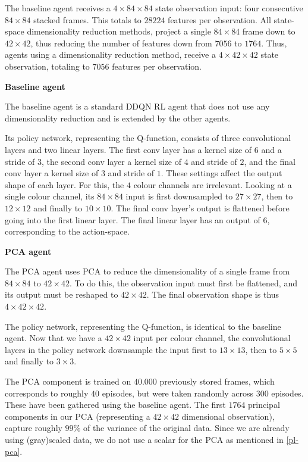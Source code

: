 The baseline agent receives a $4 \times 84 \times 84$ state observation input: four consecutive $84 \times 84$ stacked frames. This totals to $28224$ features per observation. All state-space dimensionality reduction methods, project a single $84 \times 84$ frame down to $42 \times 42$, thus reducing the number of features down from $7056$ to $1764$. Thus, agents using a dimensionality reduction method, receive a $4 \times 42 \times 42$ state observation, totaling to $7056$ features per observation. \par

\noindent \textbf{Baseline agent}\par
\noindent The baseline agent is a standard DDQN RL agent that does not use any dimensionality reduction and is extended by the other agents.

Its policy network, representing the Q-function, consists of three convolutional layers and two linear layers. The first conv layer has a kernel size of $6$ and a stride of $3$, the second conv layer a kernel size of $4$ and stride of $2$, and the final conv layer a kernel size of $3$ and stride of $1$. These settings affect the output shape of each layer. For this, the $4$ colour channels are irrelevant. Looking at a single colour channel, its $84 \times 84$ input is first downsampled to $27 \times 27$, then to $12 \times 12$ and finally to $10 \times 10$. The final conv layer's output is flattened before going into the first linear layer. The final linear layer has an output of $6$, corresponding to the action-space.\par

\noindent \textbf{PCA agent}\par
\noindent The PCA agent uses PCA to reduce the dimensionality of a single frame from $84 \times 84$ to $42 \times 42$. To do this, the observation input must first be flattened, and its output must be reshaped to $42 \times 42$. The final observation shape is thus $4 \times 42 \times 42$.

The policy network, representing the Q-function, is identical to the baseline agent. Now that we have a $42 \times 42$ input per colour channel, the convolutional layers in the policy network downsample the input first to $13 \times 13$, then to $5 \times 5$ and finally to $3 \times 3$.

The PCA component is trained on $40.000$ previously stored frames, which corresponds to roughly $40$ episodes, but were taken randomly across $300$ episodes. These have been gathered using the baseline agent. The first $1764$ principal components in our PCA (representing a $42 \times 42$ dimensional observation), capture roughly $99\%$ of the variance of the original data. Since we are already using (gray)scaled data, we do not use a scalar for the PCA  as mentioned in \ref{pl-pca}. \par

